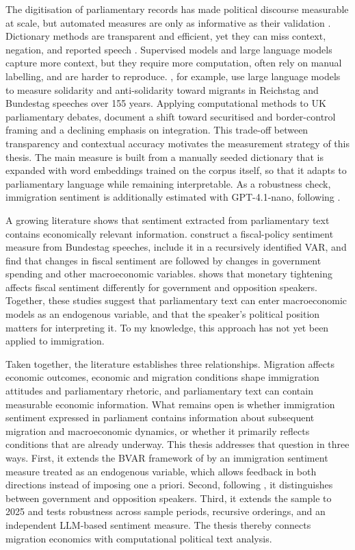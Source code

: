 \documentclass[12pt]{scrartcl}
\numberwithin{equation}{section}				%
\begin{document}
    The digitisation of parliamentary records has made political discourse measurable at scale, but automated measures are only as informative as their validation \parencite{grimmer2013text}. Dictionary methods are transparent and efficient, yet they can miss context, negation, and reported speech \parencite{kostikova2024fine}. Supervised models and large language models capture more context, but they require more computation, often rely on manual labelling, and are harder to reproduce. \textcite{kostikova2024fine}, for example, use large language models to measure solidarity and anti-solidarity toward migrants in Reichstag and Bundestag speeches over 155 years. Applying computational methods to UK parliamentary debates, \textcite{ghafouri2025framing} document a shift toward securitised and border-control framing and a declining emphasis on integration. This trade-off between transparency and contextual accuracy motivates the measurement strategy of this thesis. The main measure is built from a manually seeded dictionary that is expanded with word embeddings trained on the corpus itself, so that it adapts to parliamentary language while remaining interpretable. As a robustness check, immigration sentiment is additionally estimated with GPT-4.1-nano, following \textcite{kostikova2024fine}.
    
    A growing literature shows that sentiment extracted from parliamentary text contains economically relevant information. \textcite{latifi2024fiscal} construct a fiscal-policy sentiment measure from Bundestag speeches, include it in a recursively identified VAR, and find that changes in fiscal sentiment are followed by changes in government spending and other macroeconomic variables. \textcite{tillmann2025monetary} shows that monetary tightening affects fiscal sentiment differently for government and opposition speakers. Together, these studies suggest that parliamentary text can enter macroeconomic models as an endogenous variable, and that the speaker's political position matters for interpreting it. To my knowledge, this approach has not yet been applied to immigration.
    
    Taken together, the literature establishes three relationships. Migration affects economic outcomes, economic and migration conditions shape immigration attitudes and parliamentary rhetoric, and parliamentary text can contain measurable economic information. What remains open is whether immigration sentiment expressed in parliament contains information about subsequent migration and macroeconomic dynamics, or whether it primarily reflects conditions that are already underway. This thesis addresses that question in three ways. First, it extends the BVAR framework of \textcite{maffei2021does} by an immigration sentiment measure treated as an endogenous variable, which allows feedback in both directions instead of imposing one a priori. Second, following \textcite{tillmann2025monetary}, it distinguishes between government and opposition speakers. Third, it extends the sample to 2025 and tests robustness across sample periods, recursive orderings, and an independent LLM-based sentiment measure. The thesis thereby connects migration economics with computational political text analysis.
    
\end{document}
